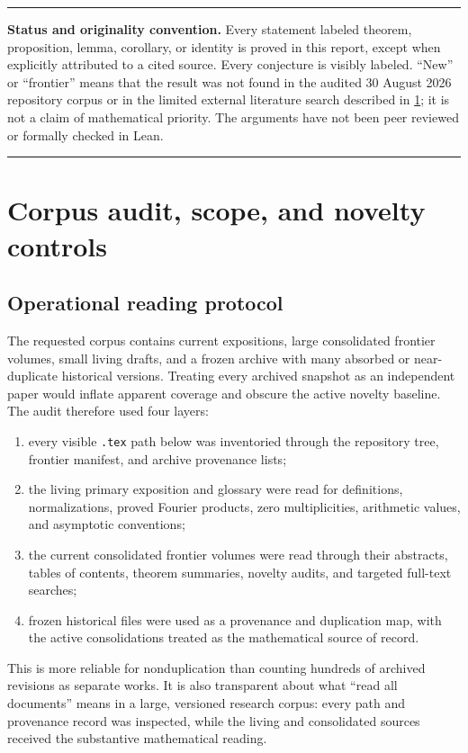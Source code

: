 \documentclass[11pt,oneside]{article}
\theoremstyle{definition}
\theoremstyle{remark}
\newenvironment{boxedremark}{%
  \par\smallskip\noindent\begin{center}\begin{minipage}{0.94\textwidth}%
  \color{black}\hrule\vspace{0.6em}\small
}{%
  \vspace{0.6em}\hrule\end{minipage}\end{center}\smallskip
}
\begin{document}
\begin{boxedremark}
\textbf{Status and originality convention.}
Every statement labeled theorem, proposition, lemma, corollary, or identity is proved in
this report, except when explicitly attributed to a cited source.  Every conjecture is
visibly labeled.  ``New'' or ``frontier'' means that the result was not found in the audited
30 August 2026 repository corpus or in the limited external literature search described
in \cref{sec:audit}; it is not a claim of mathematical priority.  The arguments have not
been peer reviewed or formally checked in Lean.
\end{boxedremark}

\tableofcontents
\clearpage

\section{Corpus audit, scope, and novelty controls}
\label{sec:audit}

\subsection{Operational reading protocol}

The requested corpus contains current expositions, large consolidated frontier volumes,
small living drafts, and a frozen archive with many absorbed or near-duplicate historical
versions.  Treating every archived snapshot as an independent paper would inflate apparent
coverage and obscure the active novelty baseline.  The audit therefore used four layers:
\begin{enumerate}
\item every visible \texttt{.tex} path below
 was inventoried through the repository tree,
frontier manifest, and archive provenance lists;
\item the living primary exposition and glossary were read for definitions, normalizations,
proved Fourier products, zero multiplicities, arithmetic values, and asymptotic conventions;
\item the current consolidated frontier volumes were read through their abstracts, tables of
contents, theorem summaries, novelty audits, and targeted full-text searches;
\item frozen historical files were used as a provenance and duplication map, with the active
consolidations treated as the mathematical source of record.
\end{enumerate}
This is more reliable for nonduplication than counting hundreds of archived revisions as
separate works.  It is also transparent about what ``read all documents'' means in a large,
versioned research corpus: every path and provenance record was inspected, while the living
and consolidated sources received the substantive mathematical reading.
\end{document}
